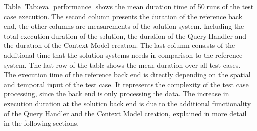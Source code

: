\documentclass[draft,final]{vutinfth} %
\begin{document}
Table \ref{Tab:eva_performance} shows the mean duration time of 50 runs of the test case execution. The second column presents the duration of the reference back end, the other columns are measurements of the solution system. Including the total execution duration of the solution, the duration of the Query Handler and the duration of the Context Model creation. The last column consists of the additional time that the solution systems needs in comparison to the reference system. The last row of the table shows the mean duration over all test cases.
The execution time of the reference back end is directly depending on the spatial and temporal input of the test case. It represents the complexity of the test case processing, since the back end is only processing the data. The increase in execution duration at the solution back end is due to the additional functionality of the Query Handler and the Context Model creation, explained in more detail in the following sections.  \\ 
\end{document}
